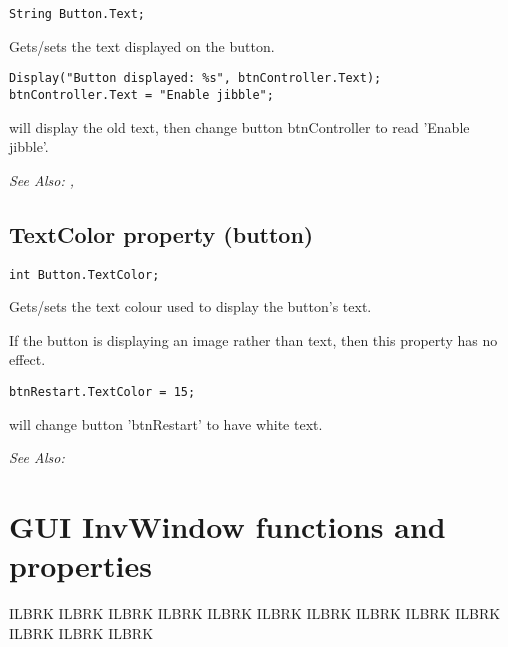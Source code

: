 \begin{verbatim}
String Button.Text;
\end{verbatim}
Gets/sets the text displayed on the button.

\begin{verbatim}
Display("Button displayed: %s", btnController.Text);
btnController.Text = "Enable jibble";
\end{verbatim}
will display the old text, then change button btnController to read 'Enable jibble'.

\it{See Also:} , 


\subsection{TextColor property (button)}\label{Button.TextColor}%

\begin{verbatim}
int Button.TextColor;
\end{verbatim}
Gets/sets the text colour used to display the button's text.

If the button is displaying an image rather than text, then this property has no effect.

\begin{verbatim}
btnRestart.TextColor = 15;
\end{verbatim}
will change button 'btnRestart' to have white text.

\it{See Also:} 



\section{GUI InvWindow functions and properties}\label{GUIInvFuncs}%

ILBRK
ILBRK
ILBRK
ILBRK
ILBRK
ILBRK
ILBRK
ILBRK
ILBRK
ILBRK
ILBRK
ILBRK
ILBRK


